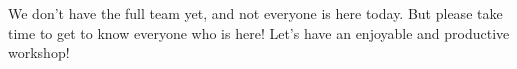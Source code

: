 \begin{frame}
\frametitle{}

We don't have the full team yet, and not everyone is here today.
\vskip 0.15in
But please take time to get to know everyone who is here!
\vskip 0.15in
Let's have an enjoyable and productive workshop!

\end{frame}


